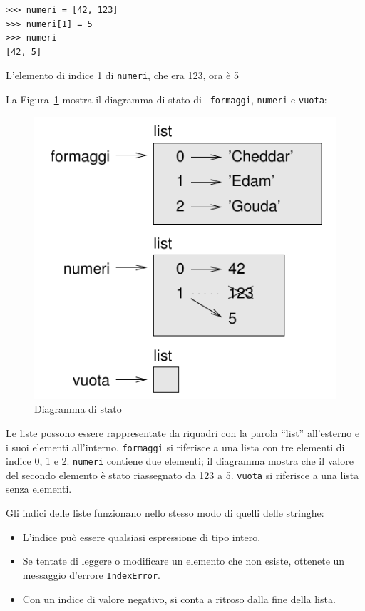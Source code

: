 \documentclass[10pt]{book}
\begin{document}
\begin{verbatim}
>>> numeri = [42, 123]
>>> numeri[1] = 5
>>> numeri
[42, 5]
\end{verbatim}
%
L'elemento di indice 1 di {\tt numeri}, che era 123, ora è 5

La Figura~\ref{fig.liststate} mostra il diagramma di stato di {\tt
formaggi}, {\tt numeri} e {\tt vuota}:


\begin{figure}
\centerline
{\includegraphics[scale=0.8]{figs/liststate.pdf}}
\caption{Diagramma di stato}
\label{fig.liststate}
\end{figure}

Le liste possono essere rappresentate da riquadri con la parola ``list'' all'esterno e i suoi elementi all'interno.  {\tt formaggi} si riferisce a una lista con tre elementi di indice 0, 1 e 2.
{\tt numeri} contiene due elementi; il diagramma mostra che il valore del secondo elemento è stato riassegnato da 123 a 5. {\tt vuota} si riferisce a una lista senza elementi.

Gli indici delle liste funzionano nello stesso modo di quelli delle stringhe:

\begin{itemize}

\item L'indice può essere qualsiasi espressione di tipo intero.

\item Se tentate di leggere o modificare un elemento che non esiste, ottenete un messaggio d'errore {\tt IndexError}.

\item Con un indice di valore negativo, si conta a ritroso dalla fine della
   lista.

\end{itemize}
\end{document}
